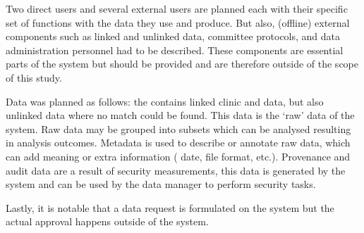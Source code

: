 Two direct users and several external users are planned each with their specific set of functions with the data they use and produce.
But also, (offline) external components such as linked and unlinked data, committee protocols, and data administration personnel had to be described.
These components are essential parts of the system but should be provided and are therefore outside of the scope of this study.

Data was planned as follows: the \projectdata{} contains linked clinic and \PRN{} data, but also unlinked data where no match could be found.
This data is the `raw' data of the system.
Raw data may be grouped into subsets which can be analysed resulting in analysis outcomes.
Metadata is used to describe or annotate raw data, which can add meaning or extra information (\eg{} date, file format, etc.).
Provenance and audit data are a result of security measurements, this data is generated by the system and can be used by the data manager to perform security tasks.

Lastly, it is notable that a data request is formulated on the system but the actual approval happens outside of the system.